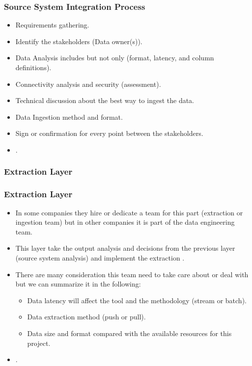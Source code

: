 \begin{frame}
    \frametitle{Source System Integration Process}
    \begin{itemize}[<+->]
        \item  Requirements gathering. %
        \item  Identify the stakeholders (Data owner(s)).
        \item  Data Analysis includes but not only (format, latency, and column definitions).
        \item  Connectivity analysis and security (assessment).
        \item  Technical discussion about the best way to ingest the data.
        \item  Data Ingestion method and format.
        \item  Sign or confirmation for every point between the stakeholders.
        \item  {}.
    \end{itemize}

\end{frame}



\subsubsection{Extraction Layer}

\begin{frame}
    \frametitle{Extraction Layer}
    \begin{itemize}[<+->]
        \item In some companies they hire or dedicate a team for this part (extraction or ingestion team) but in other companies it is part of the data engineering team.
        \item This layer take the output analysis and decisions from the previous layer (source system analysis) and implement the extraction .
        \item There are many consideration this team need to take care about or deal with but we can summarize it in the following:
        \begin{itemize}
            \item  Data latency will affect the tool and the methodology (stream or batch).
            \item  Data extraction method (push or pull).
            \item  Data size and format compared with the available resources for this project.
        \end{itemize}
        \item {}.

    \end{itemize}

\end{frame}

